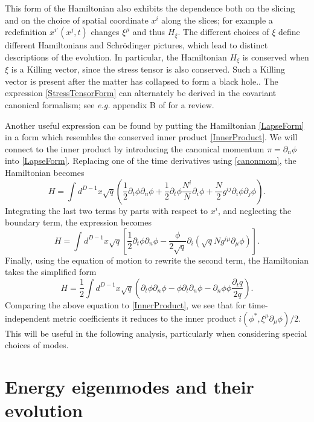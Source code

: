 \documentclass[12pt]{article}
\numberwithin{equation}{section}
\newcommand{\beq}{\begin{equation}}
\newcommand{\eeq}{\end{equation}}
\begin{document}
This form of the Hamiltonian also exhibits the dependence both on the slicing and on the choice of spatial coordinate $x^i$ along the slices; for example a redefinition $x^{i\prime}(x^j,t)$ changes $\xi^\mu$ and thus $H_\xi$.  The different choices of $\xi$ define different Hamiltonians and Schr\"odinger pictures,  which lead to distinct descriptions of the evolution.  In particular, the Hamiltonian $H_{\xi}$ is conserved when $\xi$ is a Killing vector, since the stress tensor is also conserved. Such a Killing vector is present after the  matter has collapsed to form a black hole..  The expression \eqref{StressTensorForm} can alternately be derived in the covariant canonical formalism; see {\it e.g.} appendix B of \cite{DoGi2} for a review.


Another  useful expression can be found by putting the Hamiltonian \eqref{LapseForm} in a form which resembles the conserved inner product \eqref{InnerProduct}. We will connect to the inner product by introducing the canonical momentum $\pi=\partial_n\phi$ into \eqref{LapseForm}. Replacing one of the time derivatives using \eqref{canonmom}, the Hamiltonian becomes
\beq
H= \int d^{D-1}x \sqrt{q}
\left(\frac{1}{2}\partial_t \phi \partial_n\phi + \frac{1}{2}\partial_t\phi\frac{N^i}{N}\partial_i  \phi  +\frac{N}{2}g^{ij} \partial_i \phi \partial_j \phi \right).
\eeq 
Integrating the last two terms by parts with respect to  $x^i$, and neglecting the boundary term, the expression becomes
\beq
H= \int d^{D-1}x \sqrt{q} \left[\frac{1}{2}\partial_t \phi \partial_n\phi -\frac{\phi}{2\sqrt{q}} \partial_i \left(\sqrt{q} N g^{i \mu} \partial_{\mu} \phi \right)\right].
\eeq 
Finally, using the equation of motion to rewrite the second term, the Hamiltonian takes the simplified form
\beq\label{IPform}
H= \frac{1}{2} \int d^{D-1}x \sqrt{q} \left(\partial_t \phi \partial_n\phi -\phi \partial_t \partial_n \phi -\partial_n\phi \phi \frac{\partial_t q}{2q} \right).
\eeq 
Comparing the above equation to \eqref{InnerProduct}, we see that for time-independent metric coefficients it reduces to the inner product $i(\phi^*,\xi^\mu\partial_\mu \phi)/2$.  This will be useful in the following analysis, particularly when considering special choices of modes.

\section{Energy eigenmodes and their evolution}\label{EnergyEmodes}
\end{document}
